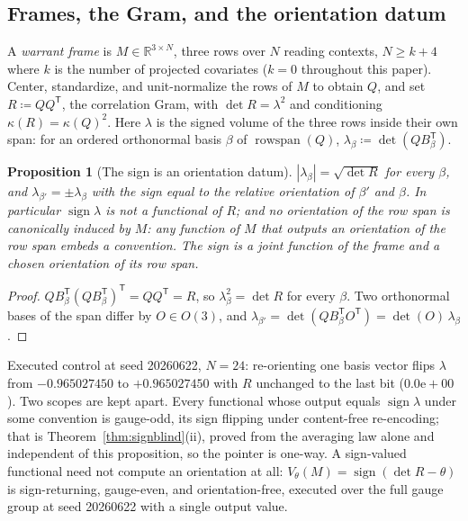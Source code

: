 \documentclass[twocolumn,10pt]{article}
\theoremstyle{plain}
\newtheorem{proposition}[theorem]{Proposition}
\theoremstyle{definition}
\newcommand{\Rl}{\mathbb{R}}
\begin{document}
\subsection{Frames, the Gram, and the orientation datum}\label{ssec:frames}
A \emph{warrant frame} is $M\in\Rl^{3\times N}$, three rows over $N$ reading contexts, $N\ge k+4$ where $k$ is the number of projected covariates ($k=0$ throughout this paper). Center, standardize, and unit-normalize the rows of $M$ to obtain $Q$, and set $R\coloneqq QQ^{\mathsf T}$, the correlation Gram, with $\det R=\lambda^2$ and conditioning $\kappa(R)=\kappa(Q)^2$. Here $\lambda$ is the signed volume of the three rows inside their own span: for an ordered orthonormal basis $\beta$ of $\operatorname{rowspan}(Q)$, $\lambda_\beta\coloneqq\det(QB_\beta^{\mathsf T})$.

\begin{proposition}[The sign is an orientation datum]\label{prop:orient}
$|\lambda_\beta|=\sqrt{\det R}$ for every $\beta$, and $\lambda_{\beta'}=\pm\lambda_\beta$ with the sign equal to the relative orientation of $\beta'$ and $\beta$. In particular $\operatorname{sign}\lambda$ is not a functional of $R$; and no orientation of the row span is canonically induced by $M$: any function of $M$ that outputs an orientation of the row span embeds a convention. The sign is a joint function of the frame and a chosen orientation of its row span.
\end{proposition}
\begin{proof}
$QB_\beta^{\mathsf T}(QB_\beta^{\mathsf T})^{\mathsf T}=QQ^{\mathsf T}=R$, so $\lambda_\beta^2=\det R$ for every $\beta$. Two orthonormal bases of the span differ by $O\in O(3)$, and $\lambda_{\beta'}=\det(QB_\beta^{\mathsf T}O^{\mathsf T})=\det(O)\,\lambda_\beta$.
\end{proof}
Executed control at seed 20260622, $N=24$: re-orienting one basis vector flips $\lambda$ from $-0.965027450$ to $+0.965027450$ with $R$ unchanged to the last bit ($0.0\mathrm{e}{+}00$). Two scopes are kept apart. Every functional whose output equals $\operatorname{sign}\lambda$ under some convention is gauge-odd, its sign flipping under content-free re-encoding; that is Theorem~\ref{thm:signblind}(ii), proved from the averaging law alone and independent of this proposition, so the pointer is one-way. A sign-valued functional need not compute an orientation at all: $V_\theta(M)=\operatorname{sign}(\det R-\theta)$ is sign-returning, gauge-even, and orientation-free, executed over the full gauge group at seed 20260622 with a single output value.
\end{document}
